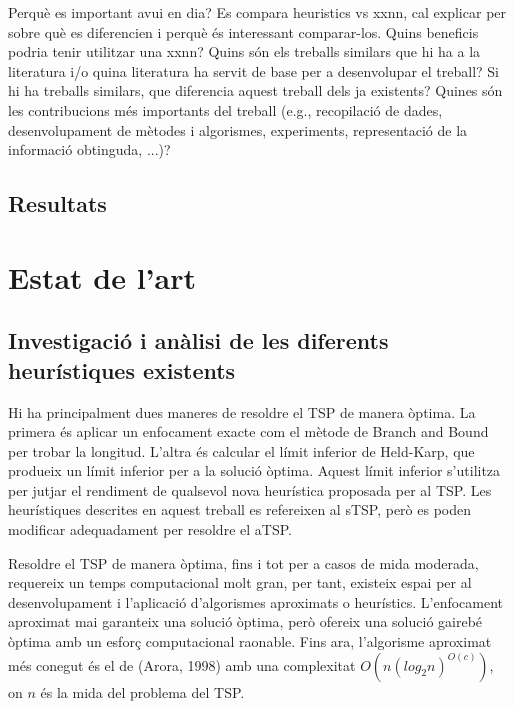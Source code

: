 \documentclass[a4paper,12pt,twoside]{ThesisStyle}
\begin{document}
Perquè es important avui en dia?
Es compara heuristics vs xxnn, cal explicar per sobre què es diferencien i perquè és interessant comparar-los.
Quins beneficis podria tenir utilitzar una xxnn?
Quins són els treballs similars que hi ha a la literatura i/o quina literatura ha servit de base per a desenvolupar el treball?
Si hi ha treballs similars, que diferencia aquest treball dels ja existents?
Quines són les contribucions més importants del treball (e.g., recopilació de dades, desenvolupament de mètodes i algorismes, experiments, representació de la informació obtinguda, ...)?



\section{Resultats}
\label{Resultats}




























\chapter{Estat de l'art}
\label{cap:estat}

\section{Investigació i anàlisi de les diferents heurístiques existents}
\label{SolucionsClassiques}
Hi ha principalment dues maneres de resoldre el TSP de manera òptima. La primera és aplicar un enfocament exacte com el mètode de Branch and Bound per trobar la longitud. L'altra és calcular el límit inferior de Held-Karp, que produeix un límit inferior per a la solució òptima. Aquest límit inferior s'utilitza per jutjar el rendiment de qualsevol nova heurística proposada per al TSP. Les heurístiques descrites en aquest treball es refereixen al sTSP, però es poden modificar adequadament per resoldre el aTSP.

\medskip

Resoldre el TSP de manera òptima, fins i tot per a casos de mida moderada, requereix un temps computacional molt gran, per tant, existeix espai per al desenvolupament i l'aplicació d'algorismes aproximats o heurístics. L'enfocament aproximat mai garanteix una solució òptima, però ofereix una solució gairebé òptima amb un esforç computacional raonable. Fins ara, l'algorisme aproximat més conegut és el de (Arora, 1998) amb una complexitat \( O \left( n \left( log_2 n \right) ^{O(c)} \right) \), on \( n \) és la mida del problema del TSP.
\end{document}
